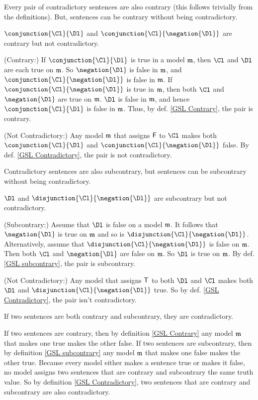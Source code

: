 \begin{majorILnc}{}
Every pair of contradictory sentences are also contrary (this follows trivially from the definitions). 
But, sentences can be contrary without being contradictory.
\end{majorILnc}
\begin{PROOF}
$\conjunction{\Cl}{\Dl}$ and $\conjunction{\Cl}{\negation{\Dl}}$ are contrary but not contradictory.

(Contrary:) If $\conjunction{\Cl}{\Dl}$ is true in a model $\mathfrak{m}$, then $\Cl$ and $\Dl$ are each true on $\mathfrak{m}$. 
So $\negation{\Dl}$ is false in $\mathfrak{m}$, and $\conjunction{\Cl}{\negation{\Dl}}$ is false in $\mathfrak{m}$.
If $\conjunction{\Cl}{\negation{\Dl}}$ is true in $\mathfrak{m}$, then both $\Cl$ and $\negation{\Dl}$ are true on $\mathfrak{m}$.
$\Dl$ is false in $\mathfrak{m}$, and hence $\conjunction{\Cl}{\Dl}$ is false in $\mathfrak{m}$.
Thus, by def. \ref{GSL Contrary}, the pair is contrary.

(Not Contradictory:) Any model $\mathfrak{m}$ that assigns $\mathsf{F}$ to $\Cl$ makes both $\conjunction{\Cl}{\Dl}$ and $\conjunction{\Cl}{\negation{\Dl}}$ false.
By def. \ref{GSL Contradictory}, the pair is not contradictory.
\end{PROOF}
\begin{majorILnc}{}
Contradictory sentences are also subcontrary, but sentences can be subcontrary without being contradictory. 
\end{majorILnc}
\begin{PROOF}
$\Dl$ and $\disjunction{\Cl}{\negation{\Dl}}$ are subcontrary but not contradictory.

(Subcontrary:) Assume that $\Dl$ is false on a model $\mathfrak{m}$.
It follows that $\negation{\Dl}$ is true on $\mathfrak{m}$ and so is $\disjunction{\Cl}{\negation{\Dl}}$. 
Alternatively, assume that $\disjunction{\Cl}{\negation{\Dl}}$ is false on $\mathfrak{m}$.  Then both $\Cl$ and $\negation{\Dl}$ are false on $\mathfrak{m}$.
So $\Dl$ is true on $\mathfrak{m}$.
By def. \ref{GSL subcontrary}, the pair is subcontrary.

(Not Contradictory:) Any model that assigns $\mathsf{T}$ to both $\Dl$ and $\Cl$ makes both $\Dl$ and $\disjunction{\Cl}{\negation{\Dl}}$ true. 
So by def. \ref{GSL Contradictory}, the pair isn't contradictory.
\end{PROOF}
\begin{majorILnc}{}
If two sentences are both contrary and subcontrary, they are contradictory. 
\end{majorILnc}
\begin{PROOF}
If two sentences are contrary, then by definition \ref{GSL Contrary} any model $\mathfrak{m}$ that makes one true makes the other false. 
If two sentences are subcontrary, then by definition \ref{GSL subcontrary} any model $\mathfrak{m}$ that makes one false makes the other true. 
Because every model either makes a sentence true or makes it false, no model assigns two sentences that are contrary and subcontrary the same truth value. 
So by definition \ref{GSL Contradictory}, two sentences that are contrary and subcontrary are also contradictory. 
\end{PROOF}
